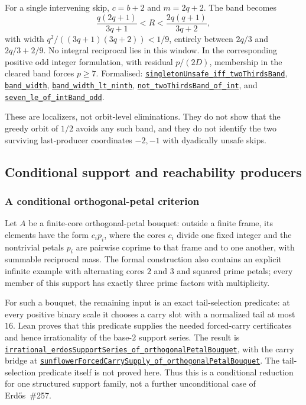 \documentclass[11pt]{article}
\newcommand{\commit}{81150c1c6fdd4cd51e76d3aa0de344341e0e9e7c}
\newcommand{\repobase}{https://github.com/wcook04/plectis-lean-erdos249-257/blob/\commit}
\newcommand{\PK}{Erdos249257}
\newcommand{\lref}[3]{\href{\repobase/\PK/#1\#L#2}{\nolinkurl{#3}}}
\newcommand{\lrefx}[3]{\href{\repobase/\PK/#1\#L#2}{\nolinkurl{#3}}}
\theoremstyle{definition}
\theoremstyle{remark}
\begin{document}
For a single intervening skip, $c=b+2$ and $m=2q+2$.  The band becomes
\[
  \frac{q(2q+1)}{3q+1}<R<\frac{2q(q+1)}{3q+2},
\]
with width $q^2/((3q+1)(3q+2))<1/9$, entirely between $2q/3$ and
$2q/3+2/9$.  No integral reciprocal lies in this window.  In the
corresponding positive odd integer formulation, with residual $p/(2D)$,
membership in the cleared band forces $p\ge7$.  Formalised:
\lrefx{HalfGreedyTwoThirdsBand.lean}{127}{singletonUnsafe_iff_twoThirdsBand},
\lrefx{HalfGreedyTwoThirdsBand.lean}{154}{band_width},
\lrefx{HalfGreedyTwoThirdsBand.lean}{163}{band_width_lt_ninth},
\lrefx{HalfGreedyTwoThirdsBand.lean}{185}{not_twoThirdsBand_of_int},
and
\lref{HalfGreedyTwoThirdsBand.lean}{231}{seven_le_of_intBand_odd}.

These are localizers, not orbit-level eliminations.  They do not show that
the greedy orbit of $1/2$ avoids any such band, and they do not identify the
two surviving last-producer coordinates $-2,-1$ with dyadically unsafe skips.

\subsection{Conditional support and reachability producers}

\subsubsection{A conditional orthogonal-petal criterion}\label{res:sunflower}

Let $A$ be a finite-core orthogonal-petal bouquet: outside a finite frame, its
elements have the form $c_i p_i$, where the cores $c_i$ divide one fixed
integer and the nontrivial petals $p_i$ are pairwise coprime to that frame and
to one another, with summable reciprocal mass.  The formal construction also
contains an explicit infinite example with alternating cores $2$ and $3$ and
squared prime petals; every member of this support has exactly three prime
factors with multiplicity.

For such a bouquet, the remaining input is an exact tail-selection predicate:
at every positive binary scale it chooses a carry slot with a normalized tail
at most $16$.  Lean proves that this predicate supplies the needed forced-carry
certificates and hence irrationality of the base-$2$ support series.  The
result is
\lref{SupportSunflowerDichotomy.lean}{540}{irrational_erdosSupportSeries_of_orthogonalPetalBouquet},
with the carry bridge at
\lrefx{SupportSunflowerDichotomy.lean}{531}{sunflowerForcedCarrySupply_of_orthogonalPetalBouquet}.
The tail-selection predicate itself is not proved here.  Thus this is a
conditional reduction for one structured support family, not a further
unconditional case of Erd\H{o}s~\#257.
\end{document}
